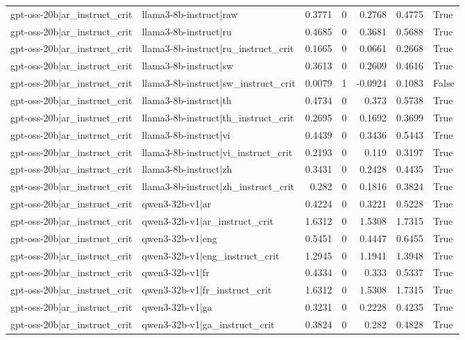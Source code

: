 \begin{table}
\begin{tabular}{l l r r r r l}
gpt-oss-20b|ar_instruct_crit & llama3-8b-instruct|raw & 0.3771 & 0 & 0.2768 & 0.4775 & True \\
gpt-oss-20b|ar_instruct_crit & llama3-8b-instruct|ru & 0.4685 & 0 & 0.3681 & 0.5688 & True \\
gpt-oss-20b|ar_instruct_crit & llama3-8b-instruct|ru_instruct_crit & 0.1665 & 0 & 0.0661 & 0.2668 & True \\
gpt-oss-20b|ar_instruct_crit & llama3-8b-instruct|sw & 0.3613 & 0 & 0.2609 & 0.4616 & True \\
gpt-oss-20b|ar_instruct_crit & llama3-8b-instruct|sw_instruct_crit & 0.0079 & 1 & -0.0924 & 0.1083 & False \\
gpt-oss-20b|ar_instruct_crit & llama3-8b-instruct|th & 0.4734 & 0 & 0.373 & 0.5738 & True \\
gpt-oss-20b|ar_instruct_crit & llama3-8b-instruct|th_instruct_crit & 0.2695 & 0 & 0.1692 & 0.3699 & True \\
gpt-oss-20b|ar_instruct_crit & llama3-8b-instruct|vi & 0.4439 & 0 & 0.3436 & 0.5443 & True \\
gpt-oss-20b|ar_instruct_crit & llama3-8b-instruct|vi_instruct_crit & 0.2193 & 0 & 0.119 & 0.3197 & True \\
gpt-oss-20b|ar_instruct_crit & llama3-8b-instruct|zh & 0.3431 & 0 & 0.2428 & 0.4435 & True \\
gpt-oss-20b|ar_instruct_crit & llama3-8b-instruct|zh_instruct_crit & 0.282 & 0 & 0.1816 & 0.3824 & True \\
gpt-oss-20b|ar_instruct_crit & qwen3-32b-v1|ar & 0.4224 & 0 & 0.3221 & 0.5228 & True \\
gpt-oss-20b|ar_instruct_crit & qwen3-32b-v1|ar_instruct_crit & 1.6312 & 0 & 1.5308 & 1.7315 & True \\
gpt-oss-20b|ar_instruct_crit & qwen3-32b-v1|eng & 0.5451 & 0 & 0.4447 & 0.6455 & True \\
gpt-oss-20b|ar_instruct_crit & qwen3-32b-v1|eng_instruct_crit & 1.2945 & 0 & 1.1941 & 1.3948 & True \\
gpt-oss-20b|ar_instruct_crit & qwen3-32b-v1|fr & 0.4334 & 0 & 0.333 & 0.5337 & True \\
gpt-oss-20b|ar_instruct_crit & qwen3-32b-v1|fr_instruct_crit & 1.6312 & 0 & 1.5308 & 1.7315 & True \\
gpt-oss-20b|ar_instruct_crit & qwen3-32b-v1|ga & 0.3231 & 0 & 0.2228 & 0.4235 & True \\
gpt-oss-20b|ar_instruct_crit & qwen3-32b-v1|ga_instruct_crit & 0.3824 & 0 & 0.282 & 0.4828 & True \\

\end{tabular}
\end{table}
